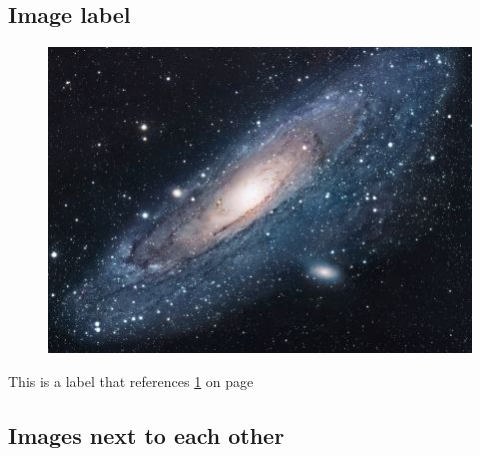 \documentclass{article}
\begin{document}
\subsection{Image label}
\begin{figure}[!ht]
  \centering
\includegraphics[]{universe.jpg}
\label{fig:spiralgalaxy}
\end{figure}

This is a label that references \ref{fig:spiralgalaxy} on page \pageref{fig:spiralgalaxy}

\subsection{Images next to each other}
\end{document}
